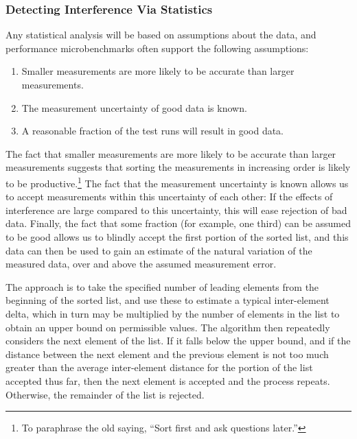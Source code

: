 \subsubsection{Detecting Interference Via Statistics}
\label{sec:debugging:Detecting Interference Via Statistics}

Any statistical analysis will be based on assumptions about the data,
and performance microbenchmarks often support the following assumptions:

\begin{enumerate}
\item	Smaller measurements are more likely to be accurate than
	larger measurements.
\item	The measurement uncertainty of good data is known.
\item	A reasonable fraction of the test runs will result in good data.
\end{enumerate}

The fact that smaller measurements are more likely to be accurate than
larger measurements suggests that sorting the measurements in increasing
order is likely to be productive.\footnote{
	To paraphrase the old saying, ``Sort first and ask questions later.''}
The fact that the measurement uncertainty is known allows us to accept
measurements within this uncertainty of each other:  If the effects of
interference are large compared to this uncertainty, this will ease
rejection of bad data.
Finally, the fact that some fraction (for example, one third) can be
assumed to be good allows us to blindly accept the first portion of the
sorted list, and this data can then be used to gain an estimate of the
natural variation of the measured data, over and above the assumed
measurement error.

The approach is to take the specified number of leading elements from the
beginning of the sorted list, and use these to estimate a typical
inter-element delta, which in turn may be multiplied by the number of
elements in the list to obtain an upper bound on permissible values.
The algorithm then repeatedly considers the next element of the list.
If it falls below the upper bound, and if the distance between
the next element and the previous element is not too much greater than
the average inter-element distance for the portion of the list accepted
thus far, then the next element is accepted and the process repeats.
Otherwise, the remainder of the list is rejected.

